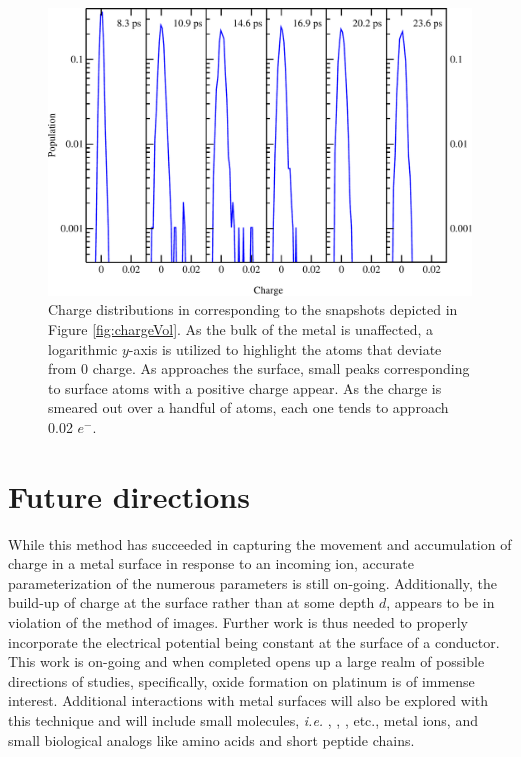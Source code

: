 \begin{figure}
  \centering
  \includegraphics[width=0.9\linewidth]{../figures/chap5/frameChargeDistribution.pdf}
  \caption{Charge distributions in  corresponding to the snapshots
depicted in Figure \ref{fig:chargeVol}. As the bulk of the metal is unaffected, a
logarithmic $y$-axis is utilized to highlight the atoms that deviate from 0
charge. As  approaches the surface, small peaks corresponding to surface
 atoms with a positive charge appear. As the charge is smeared
out over a handful of  atoms, each one tends to approach 0.02 $e^-$.}
\label{fig:chargeHistogram}
\end{figure}

\section{Future directions}
While this method has succeeded in capturing the movement and accumulation of
charge in a metal surface in response to an incoming ion, accurate
parameterization of the numerous parameters is still on-going. Additionally,
the build-up of charge at the surface rather than at some depth $d$, appears to
be in violation of the method of images. Further work is thus needed to
properly incorporate the electrical potential being constant at the surface of
a conductor.  This work is on-going and when completed opens up a large realm
of possible directions of studies, specifically, oxide formation on platinum is
of immense interest. Additional interactions with metal surfaces will also be
explored with this technique and will include small molecules, {\em i.e.}
, , , etc., metal ions, and small biological analogs like
amino acids and short peptide chains.



